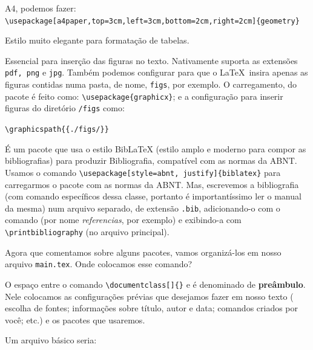 \begin{description}
    A4, podemos fazer:\\
    {\small \Verb|\usepackage[a4paper,top=3cm,left=3cm,bottom=2cm,right=2cm]{geometry}|}
  \item[\hrefB{https://ctan.org/pkg/booktabs}{\sffamily booktabs}] Estilo muito 
   elegante para formatação de tabelas.
  \item[\hrefB{https://ctan.org/pkg/graphicx}{graphicx}] Essencial para inserção
    das figuras no texto.
    Nativamente suporta as extensões \texttt{pdf, png} e \texttt{jpg}.
    Também podemos configurar para que o \LaTeX\ insira apenas as figuras 
    contidas numa pasta, de nome, \texttt{figs}, por exemplo. 
    O carregamento, do pacote é feito como: \Verb|\usepackage{graphicx}|; e a 
    configuração para inserir figuras do diretório \texttt{/figs} como:
    \begin{center}
      \Verb|\graphicspath{{./figs/}}|
    \end{center}
  \item[\hrefB{https://github.com/abntex/biblatex-abnt}{biblatex-abnt}] É um 
    pacote que usa o estilo BibLaTeX (estilo amplo e moderno para compor as 
    bibliografias) para produzir Bibliografia, compatível com as normas da ABNT.
    Usamos o comando \Verb|\usepackage[style=abnt, justify]{biblatex}| para 
    carregarmos o pacote com as normas da ABNT.
    Mas, escrevemos a bibliografia (com comando específicos dessa classe, portanto
    é importantíssimo ler o manual da mesma) num arquivo separado, de extensão 
    \texttt{.bib}, adicionando-o com o comando 
    \Verb|| (por nome \textit{referencias}, por 
    exemplo) e exibindo-a com \Verb|\printbibliography| (no arquivo principal).
\end{description}

Agora que comentamos sobre alguns pacotes, vamos organizá-los em nosso arquivo 
\texttt{main.tex}.
Onde colocamos esse comando?

O espaço entre o comando \Verb|\documentclass[]{}| e \Verb|| é 
denominado de \textsf{\textbf{preâmbulo}}.
Nele colocamos as configurações prévias que desejamos fazer em nosso texto (
escolha de fontes; informações sobre título, autor e data; comandos criados por 
você; etc.) e os pacotes que usaremos. 

Um arquivo básico seria: 

